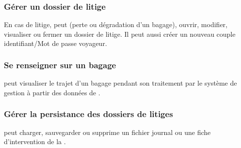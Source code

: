 \subsubsection{Gérer un dossier de litige}
En cas de litige,   peut (perte ou dégradation d'un bagage), ouvrir, modifier, visualiser ou fermer un dossier de litige. Il peut aussi créer un nouveau couple identifiant/Mot de passe voyageur.

\subsubsection	{Se renseigner sur un bagage}
 peut visualiser le trajet d'un bagage pendant son traitement par le système de gestion à partir des données de .

\subsubsection{Gérer la persistance des dossiers de litiges}
 peut charger, sauvegarder ou supprime un fichier journal ou une fiche d'intervention de la .

